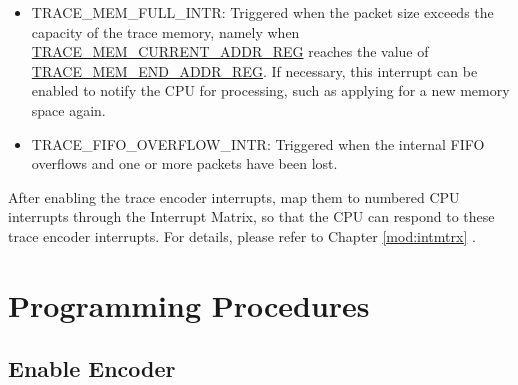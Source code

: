 \documentclass[main\_\_EN.tex]{subfiles}
\begin{document}
\begin{itemize}
    \item TRACE\_MEM\_FULL\_INTR: Triggered when the packet size exceeds the capacity of the trace memory, namely when \hyperref[regdesc:TRACEMEMCURRENTADDRREG]{TRACE\_MEM\_CURRENT\_ADDR\_REG} reaches the value of \hyperref[regdesc:TRACEMEMENDADDRREG]{TRACE\_MEM\_END\_ADDR\_REG}. If necessary, this interrupt can be enabled to notify the CPU for processing, such as applying for a new memory space again.
    \item TRACE\_FIFO\_OVERFLOW\_INTR: Triggered when the internal FIFO overflows and one or more packets have been lost.
\end{itemize}


After enabling the trace encoder interrupts, map them to numbered CPU interrupts through the Interrupt Matrix, so that the CPU can respond to these trace encoder interrupts. For details, please refer to Chapter \ref{mod:intmtrx} \textit{}.


\section{Programming Procedures}
\label{sec:riscvtracenc-prog-procedures}

\subsection{Enable Encoder}
\end{document}
